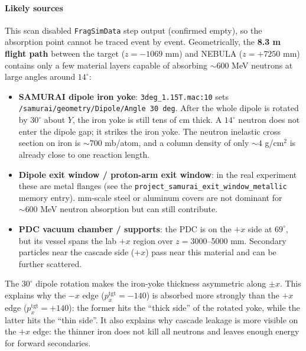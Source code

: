 \documentclass[a4paper,11pt]{article}
\begin{document}
\paragraph{Likely sources}
This scan disabled \texttt{FragSimData} step output (confirmed empty), so the
absorption point cannot be traced event by event. Geometrically, the
\textbf{8.3 m flight path} between the target ($z=-1069$ mm) and NEBULA
($z=+7250$ mm) contains only a few material layers capable of absorbing
$\sim 600$ MeV neutrons at large angles around $14^\circ$:
\begin{itemize}[itemsep=-2pt]
    \item \textbf{SAMURAI dipole iron yoke}: \texttt{3deg\_1.15T.mac:10} sets
          \texttt{/samurai/geometry/Dipole/Angle 30 deg}. After the whole
          dipole is rotated by $30^\circ$ about $Y$, the iron yoke is still
          tens of cm thick. A $14^\circ$ neutron does not enter the dipole gap;
          it strikes the iron yoke. The neutron inelastic cross section on iron
          is $\sim 700$ mb/atom, and a column density of only
          $\sim 4$ g/cm$^2$ is already close to one reaction length.
    \item \textbf{Dipole exit window / proton-arm exit window}: in the real
          experiment these are metal flanges (see the
          \texttt{project\_samurai\_exit\_window\_metallic} memory entry).
          mm-scale steel or aluminum covers are not dominant for
          $\sim 600$ MeV neutron absorption but can still contribute.
    \item \textbf{PDC vacuum chamber / supports}: the PDC is on the $+x$ side at
          $69^\circ$, but its vessel spans the lab $+x$ region over
          $z=3000$--5000 mm. Secondary particles near the cascade side ($+x$)
          pass near this material and can be further scattered.
\end{itemize}

The $30^\circ$ dipole rotation makes the iron-yoke thickness asymmetric along
$\pm x$. This explains why the $-x$ edge
($p_x^\mathrm{tgt}=-140$) is absorbed more strongly than the $+x$ edge
($p_x^\mathrm{tgt}=+140$): the former hits the ``thick side'' of the rotated
yoke, while the latter hits the ``thin side''. It also explains why cascade
leakage is more visible on the $+x$ edge: the thinner iron does not kill all
neutrons and leaves enough energy for forward secondaries.
\end{document}
